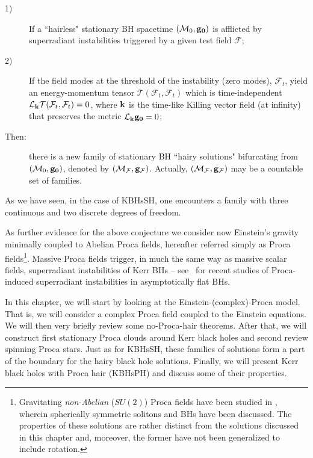 \begin{description}
\item[1)] If a ``hairless" stationary BH spacetime $(\mathcal{M}_0,{\bf g_0})$ is afflicted by superradiant instabilities triggered by a given test field $\mathcal{F}$;
\item[2)] If the field modes at the threshold of the instability (zero modes), $\mathcal{F}_t$, yield an energy-momentum tensor $\mathcal{T}(\mathcal{F}_t,\mathcal{F}_t)$ which is time-independent $\mathcal{L}_{\bf k}\mathcal{T}(\mathcal{F}_t,\mathcal{F}_t)=0$, where ${\bf k}$ is the time-like Killing vector field (at infinity) that preserves the metric $\mathcal{L}_{\bf k}{\bf g_0}=0$;
\item[Then:] there is a new family of stationary BH ``hairy solutions" bifurcating from $(\mathcal{M}_0,{\bf g_0})$, denoted by $(\mathcal{M}_\mathcal{F},{\bf g_\mathcal{F}})$. Actually, $(\mathcal{M}_\mathcal{F},{\bf g_\mathcal{F}})$ may be a countable set of families.
\end{description}
As we have seen, in the case of KBHsSH, one encounters a family with three continuous and two discrete degrees of freedom.

As further evidence for the above conjecture we consider now 
Einstein's gravity minimally coupled to Abelian Proca fields, hereafter referred simply as Proca fields\footnote{Gravitating \textit{non-Abelian} ($SU(2)$) Proca fields have been studied in \cite{Greene:1992fw}, wherein spherically symmetric solitons and BHs have been discussed. The properties of these solutions are rather distinct from the solutions discussed in this chapter and, moreover, the former have not been generalized to include rotation.}. 
Massive Proca fields trigger, in much the same way as massive scalar fields, 
superradiant instabilities of Kerr BHs -- see~\cite{Pani:2012vp,Pani:2012bp,Witek:2012tr} 
for recent studies of Proca-induced superradiant instabilities in asymptotically flat BHs. 

In this chapter, we will start by looking at the Einstein-(complex)-Proca model.
That is, we will consider a complex Proca field coupled to the Einstein equations.
We will then very briefly review some no-Proca-hair theorems.
After that, we will construct first stationary Proca clouds around Kerr black holes and second review spinning Proca stars.
Just as for KBHsSH, these families of solutions form a part of the boundary for the hairy black hole solutions.
Finally, we will present Kerr black holes with Proca hair (KBHsPH) and discuss some of their properties.

